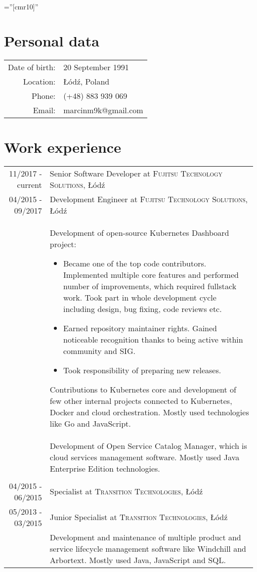 \documentclass[a4paper,10pt]{article}
\begin{document}
\font\fb=''[cmr10]''
\par{}

\section{Personal data}

\begin{tabular}{rl}
    Date of birth: & 20 September 1991\\
    Location: & Łódź, Poland\\
    Phone: & (+48) 883 939 069\\
    Email: & marcinm9k@gmail.com\\
\end{tabular}

\section{Work experience}

\begin{tabular}{r|p{11cm}}

11/2017 - current & Senior Software Developer at \textsc{Fujitsu Technology Solutions}, Łódź \\
04/2015 - 09/2017 & Development Engineer at \textsc{Fujitsu Technology Solutions}, Łódź \\
 & \footnotesize{Development of open-source Kubernetes Dashboard project:
 \begin{itemize}
 	\item Became one of the top code contributors. Implemented multiple core features and performed number of improvements, which required fullstack work. Took part in whole development cycle including design, bug fixing, code reviews etc.
 	\item Earned repository maintainer rights. Gained noticeable recognition thanks to being active within community and SIG.
 	\item Took responsibility of preparing new releases.
 \end{itemize}
 Contributions to Kubernetes core and development of few other internal projects connected to Kubernetes, Docker and cloud orchestration. Mostly used technologies like Go and JavaScript.}\\
 & \footnotesize{Development of Open Service Catalog Manager, which is cloud services management software. Mostly used Java Enterprise Edition technologies.}\\\multicolumn{2}{c}{} \\

04/2015 - 06/2015 & Specialist at \textsc{Transition Technologies}, Łódź \\
05/2013 - 03/2015 & Junior Specialist at \textsc{Transition Technologies}, Łódź \\
 & \footnotesize{Development and maintenance of multiple product and service lifecycle management software like Windchill and Arbortext. Mostly used Java, JavaScript and SQL.}\\

\end{tabular}
\end{document}
